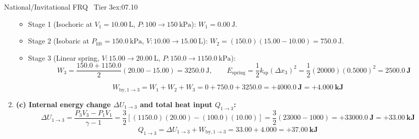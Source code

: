 \begin{workedexample}{National/Invitational FRQ \textbar\ Tier 3}{ex:07.10}
\begin{enumerate}
  \begin{itemize}
    \item Stage 1 (Isochoric at $V_1 = \SI{10.00}{\liter}$, $P: 100\to\SI{150}{\kilo\pascal}$): $W_1 = \SI{0.00}{\joule}$.
    \item Stage 2 (Isobaric at $P_{\mathrm{lift}} = \SI{150.0}{\kilo\pascal}$, $V: 10.00\to\SI{15.00}{\liter}$): $W_2 = (150.0)(15.00 - 10.00) = \SI{+750.0}{\joule}$.
    \item Stage 3 (Linear spring, $V: 15.00\to\SI{20.00}{\liter}$, $P: 150.0\to\SI{1150.0}{\kilo\pascal}$):
    \[
      W_3 = \frac{150.0 + 1150.0}{2}(20.00 - 15.00) = \SI{+3250.0}{\joule}, \qquad E_{\mathrm{spring}} = \frac{1}{2}k_{\mathrm{sp}}(\Delta x_3)^2 = \frac{1}{2}(20000)(0.5000)^2 = \mathbf{\SI{2500.0}{\joule}}
    \]
  \end{itemize}
  \[
    W_{\mathrm{by},1\to 3} = W_1 + W_2 + W_3 = 0 + 750.0 + 3250.0 = \mathbf{+\SI{4000.0}{\joule}} = \mathbf{+\SI{4.000}{\kilo\joule}}
  \]
  \item \textbf{(c) Internal energy change $\Delta U_{1\to 3}$ and total heat input $Q_{1\to 3}$:}
  \[
    \Delta U_{1\to 3} = \frac{P_3 V_3 - P_1 V_1}{\gamma - 1} = \frac{3}{2}\left[(1150.0)(20.00) - (100.0)(10.00)\right] = \frac{3}{2}(23000 - 1000) = \mathbf{+\SI{33000.0}{\joule}} = \mathbf{+\SI{33.00}{\kilo\joule}}
  \]
  \[
    Q_{1\to 3} = \Delta U_{1\to 3} + W_{\mathrm{by},1\to 3} = 33.00 + 4.000 = \mathbf{+\SI{37.00}{\kilo\joule}}
  \]
\end{enumerate}
\end{workedexample}

